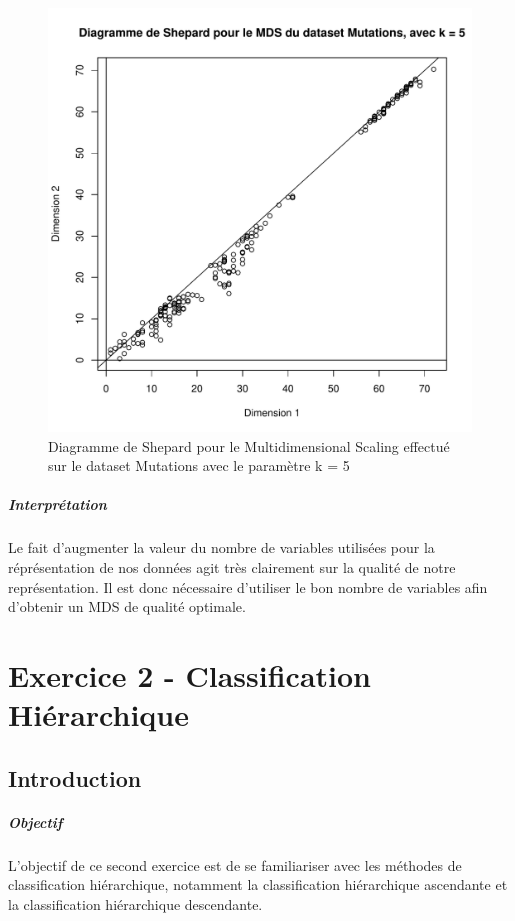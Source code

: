 \documentclass{report}
\begin{document}
\begin{figure}[ht!]
\begin{center}
    \includegraphics[width=\textwidth]{../plots/E1Q3_SHEP5m.pdf}
    \caption{Diagramme de Shepard pour le Multidimensional Scaling effectué sur le dataset Mutations avec le paramètre k = 5}
\end{center}
\end{figure}
\paragraph{Interprétation}
Le fait d'augmenter la valeur du nombre de variables utilisées pour la réprésentation de nos données agit très clairement sur la qualité de notre représentation. Il est donc nécessaire d'utiliser le bon nombre de variables afin d'obtenir un MDS de qualité optimale.
\newpage
\chapter{Exercice 2 - Classification Hiérarchique}
\section{Introduction}
\paragraph{Objectif}
L'objectif de ce second exercice est de se familiariser avec les méthodes de classification hiérarchique, notamment la classification hiérarchique ascendante et la classification hiérarchique descendante.
\end{document}
